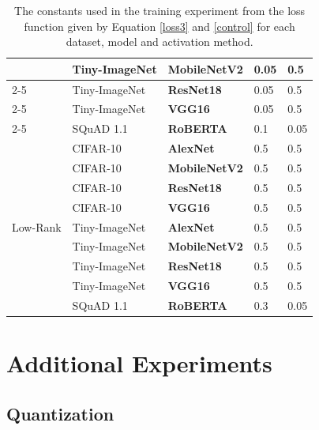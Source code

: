 \documentclass{article}
\theoremstyle{plain}
\theoremstyle{definition}
\theoremstyle{remark}
\begin{document}
\begin{table}[h]
\begin{tabular}{|l|l|l|l|l|}
                          & Tiny-ImageNet & \textbf{MobileNetV2} & 0.05 & 0.5  \\ \cline{2-5} 
                          & Tiny-ImageNet & \textbf{ResNet18}    & 0.05 & 0.5  \\ \cline{2-5} 
                          & Tiny-ImageNet & \textbf{VGG16}       & 0.05 & 0.5  \\ \cline{2-5} 
                          & SQuAD 1.1     & \textbf{RoBERTA}     & 0.1  & 0.05 \\ \hline
\multirow{9}{*}{Low-Rank} & CIFAR-10       & \textbf{AlexNet}     & 0.5  & 0.5  \\ \cline{2-5} 
                          & CIFAR-10       & \textbf{MobileNetV2} & 0.5  & 0.5  \\ \cline{2-5} 
                          & CIFAR-10       & \textbf{ResNet18}    & 0.5  & 0.5  \\ \cline{2-5} 
                          & CIFAR-10       & \textbf{VGG16}       & 0.5  & 0.5  \\ \cline{2-5} 
                          & Tiny-ImageNet & \textbf{AlexNet}     & 0.5  & 0.5  \\ \cline{2-5} 
                          & Tiny-ImageNet & \textbf{MobileNetV2} & 0.5  & 0.5  \\ \cline{2-5} 
                          & Tiny-ImageNet & \textbf{ResNet18}    & 0.5  & 0.5  \\ \cline{2-5} 
                          & Tiny-ImageNet & \textbf{VGG16}       & 0.5  & 0.5  \\ \cline{2-5} 
                          & SQuAD 1.1     & \textbf{RoBERTA}     & 0.3  & 0.05 \\ \hline
\end{tabular}%
\caption{The constants used in the training experiment from the loss function given by Equation \ref{loss3} and  \ref{control} for each dataset, model and activation method.}
\label{tab:contants}
\end{table}


\section{Additional Experiments}\label{app}

\subsection{Quantization}\label{quant}
\end{document}
